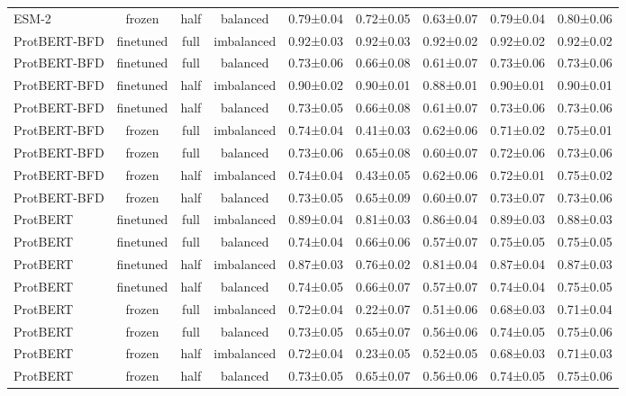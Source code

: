 \begin{tabular}{lcccccccc}
       ESM-2 &         frozen &      half &   balanced & 0.79±0.04 & 0.72±0.05 & 0.63±0.07 & 0.79±0.04 & 0.80±0.06 \\
ProtBERT-BFD &      finetuned &      full & imbalanced & 0.92±0.03 & 0.92±0.03 & 0.92±0.02 & 0.92±0.02 & 0.92±0.02 \\
ProtBERT-BFD &      finetuned &      full &   balanced & 0.73±0.06 & 0.66±0.08 & 0.61±0.07 & 0.73±0.06 & 0.73±0.06 \\
ProtBERT-BFD &      finetuned &      half & imbalanced & 0.90±0.02 & 0.90±0.01 & 0.88±0.01 & 0.90±0.01 & 0.90±0.01 \\
ProtBERT-BFD &      finetuned &      half &   balanced & 0.73±0.05 & 0.66±0.08 & 0.61±0.07 & 0.73±0.06 & 0.73±0.06 \\
ProtBERT-BFD &         frozen &      full & imbalanced & 0.74±0.04 & 0.41±0.03 & 0.62±0.06 & 0.71±0.02 & 0.75±0.01 \\
ProtBERT-BFD &         frozen &      full &   balanced & 0.73±0.06 & 0.65±0.08 & 0.60±0.07 & 0.72±0.06 & 0.73±0.06 \\
ProtBERT-BFD &         frozen &      half & imbalanced & 0.74±0.04 & 0.43±0.05 & 0.62±0.06 & 0.72±0.01 & 0.75±0.02 \\
ProtBERT-BFD &         frozen &      half &   balanced & 0.73±0.05 & 0.65±0.09 & 0.60±0.07 & 0.73±0.07 & 0.73±0.06 \\
    ProtBERT &      finetuned &      full & imbalanced & 0.89±0.04 & 0.81±0.03 & 0.86±0.04 & 0.89±0.03 & 0.88±0.03 \\
    ProtBERT &      finetuned &      full &   balanced & 0.74±0.04 & 0.66±0.06 & 0.57±0.07 & 0.75±0.05 & 0.75±0.05 \\
    ProtBERT &      finetuned &      half & imbalanced & 0.87±0.03 & 0.76±0.02 & 0.81±0.04 & 0.87±0.04 & 0.87±0.03 \\
    ProtBERT &      finetuned &      half &   balanced & 0.74±0.05 & 0.66±0.07 & 0.57±0.07 & 0.74±0.04 & 0.75±0.05 \\
    ProtBERT &         frozen &      full & imbalanced & 0.72±0.04 & 0.22±0.07 & 0.51±0.06 & 0.68±0.03 & 0.71±0.04 \\
    ProtBERT &         frozen &      full &   balanced & 0.73±0.05 & 0.65±0.07 & 0.56±0.06 & 0.74±0.05 & 0.75±0.06 \\
    ProtBERT &         frozen &      half & imbalanced & 0.72±0.04 & 0.23±0.05 & 0.52±0.05 & 0.68±0.03 & 0.71±0.03 \\
    ProtBERT &         frozen &      half &   balanced & 0.73±0.05 & 0.65±0.07 & 0.56±0.06 & 0.74±0.05 & 0.75±0.06 \\

\end{tabular}
